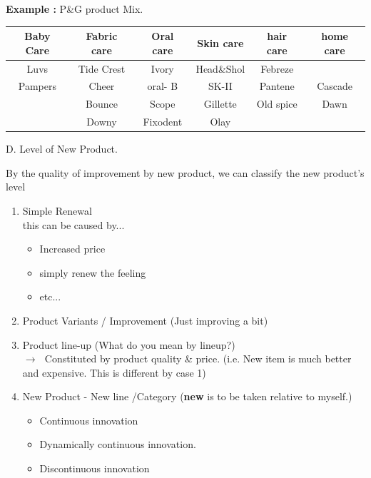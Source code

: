 \documentclass[12pt]{article}
\newcommand{\ra}{$\rightarrow \text{ }$}
\begin{document}
\textbf{Example :} P\&G product Mix.



\begin{tabular}{c|c|c|c|c|c}
	\hline
	Baby Care & Fabric care & Oral care & Skin care & hair care & home care \\
	\hline
	Luvs & Tide Crest & Ivory & Head\&Shol & Febreze \\
	Pampers & Cheer & oral- B & SK-II & Pantene & Cascade \\
	 & Bounce & Scope & Gillette & Old spice & Dawn \\
	 & Downy & Fixodent & Olay \\

\end{tabular}

D. Level of New Product.

By the quality of improvement by new product, we can classify the new product's level

\begin{enumerate}
	\item Simple Renewal \\
	this can be caused by...
	\begin{itemize}
		\item Increased price
		\item simply renew the feeling
		\item etc...
	\end{itemize}
	 \item Product Variants / Improvement (Just improving a bit)
	 \item Product line-up (What do you mean by lineup?) \\
	 \ra Constituted by product quality \& price. (i.e. New item is much better and expensive. This is different by case 1)
	 \item New Product - New line /Category (\textbf{new} is to be taken relative to myself.) \\
	 \begin{itemize}
	 	\item Continuous innovation
		\item Dynamically continuous innovation.
		\item Discontinuous innovation
	 \end{itemize}

\end{enumerate}
\end{document}
